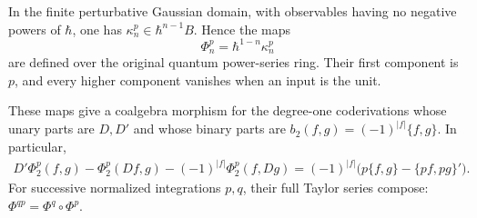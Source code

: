 \begin{theorem}\label{mht:thm:quantum-cumulants}
In the finite perturbative Gaussian domain, with observables having
no negative powers of $\hbar$, one has
$\kappa_n^p\in\hbar^{n-1}B$. Hence the maps
\[
 \Phi_n^p=\hbar^{1-n}\kappa_n^p
\]
are defined over the original quantum power-series ring.
Their first component is $p$, and every higher component vanishes
when an input is the unit.

These maps give a coalgebra morphism for the degree-one coderivations
whose unary parts are $D,D'$ and whose binary parts are
$b_2(f,g)=(-1)^{|f|}\{f,g\}$. In particular,
\begin{align}
 D'\Phi_2^p(f,g)-\Phi_2^p(Df,g)
       -(-1)^{|f|}\Phi_2^p(f,Dg)
   =(-1)^{|f|}\bigl(p\{f,g\}-\{pf,pg\}'\bigr).
 \label{mht:eq:binary-quantum-ward}
\end{align}
For successive normalized integrations $p,q$, their full Taylor
series compose: $\Phi^{qp}=\Phi^q\circ\Phi^p$.
\end{theorem}

